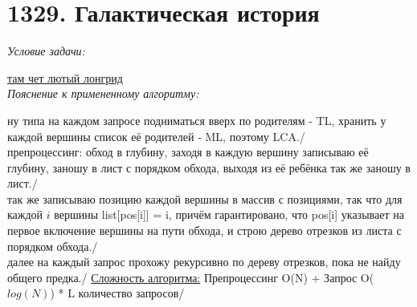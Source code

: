 \tableofcontents

\newpage


\section{1329. Галактическая история}
\textit{Условие задачи:} \par
\href{https://acm.timus.ru/problem.aspx?space=1&num=1329}{там чет лютый лонгрид}\\

\textit{Пояснение к примененному алгоритму:} \par
ну типа на каждом запросе подниматься вверх по родителям - TL, хранить у каждой вершины список её родителей - ML, поэтому LCA./\\
препроцессинг: обход в глубину, заходя в каждую вершину записываю её глубину, заношу в лист с порядком обхода, выходя из её ребёнка так же заношу в лист./\\
так же записываю позицию каждой вершины в массив с позициями, так что для каждой $i$ вершины list[pos[i]] = i, причём гарантировано,
что pos[i] указывает на первое включение вершины на пути обхода, и строю дерево отрезков из листа с порядком обхода./\\
далее на каждый запрос прохожу рекурсивно по дереву отрезков, пока не найду общего предка./
\underline{Сложность алгоритма:} Препроцессинг O(N) + Запрос O($log(N)$) * L количество запросов/\\


